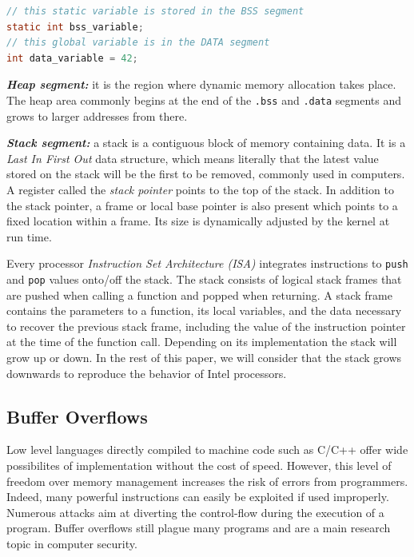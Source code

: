 \documentclass[10pt,twocolumn]{article}
\begin{document}
\begin{lstlisting}[aboveskip=\bigskipamount,belowskip=\medskipamount,caption=Variable
location in memory,language=C] 
// this static variable is stored in the BSS segment
static int bss_variable;
// this global variable is in the DATA segment
int data_variable = 42; 
\end{lstlisting}

\textbf{\textit{Heap segment:}} it is the region where dynamic memory
allocation takes place. The heap area commonly begins at the end of the
\texttt{.bss} and \texttt{.data} segments and grows to larger addresses from
there.

\textit{\textbf{Stack segment:}} a stack is a contiguous block of memory
containing data. It is a \textit{Last In First Out} data structure, which means
literally that the latest value stored on the stack will be the first to be
removed, commonly used
in computers. A register called the \textit{stack pointer} points to
the top of the stack. In addition to the stack pointer, a frame or local base
pointer is also present which points to a fixed location within a frame. Its
size is dynamically adjusted by the kernel at run time.

Every processor \textit{Instruction Set Architecture (ISA)} integrates
instructions to \texttt{push} and \texttt{pop} values onto/off the stack. The stack consists of
logical stack frames that are pushed when calling a function and popped when
returning. A stack frame contains the parameters to a function, its local
variables, and the data necessary to recover the previous stack frame,
including the value of the instruction pointer at the time of the function
call. Depending on its implementation the stack will grow up or down. In the
rest of this paper, we will consider that the stack grows downwards to
reproduce the behavior of Intel processors.

\subsection{Buffer Overflows}

Low level languages directly compiled to machine code such as C/C++ offer wide
possibilites of implementation without the cost of speed. However, this level
of freedom over memory management increases the risk of errors from programmers.
Indeed, many powerful instructions can easily be exploited if used improperly.
Numerous attacks aim at diverting the control-flow during the execution of a
program. Buffer overflows still plague many programs and are a main research
topic in computer
security\cite{DBLP:journals/iee/MouzaraniSZ16,DBLP:journals/iee/PadmanabhuniT16,DBLP:conf/ant/LeonB16}.
\end{document}
